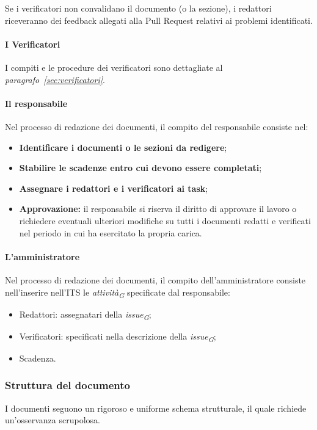 Se i verificatori non convalidano il documento (o la sezione), i redattori riceveranno dei feedback allegati alla Pull Request relativi ai problemi identificati.

\paragraph{I Verificatori}
I compiti e le procedure dei verificatori sono dettagliate al \textit{paragrafo~\ref{sec:verificatori}}.

\paragraph{Il responsabile}
Nel processo di redazione dei documenti, il compito del responsabile consiste nel:
\begin{itemize}
    \item \textbf{Identificare i documenti o le sezioni da redigere};
    \item \textbf{Stabilire le scadenze entro cui devono essere completati};
    \item \textbf{Assegnare i redattori e i verificatori ai task};
    \item \textbf{Approvazione:} il responsabile si riserva il diritto di approvare il lavoro o richiedere eventuali ulteriori modifiche su tutti i documenti redatti e verificati nel periodo in cui ha esercitato la propria carica.
\end{itemize}

\paragraph{L'amministratore}
Nel processo di redazione dei documenti, il compito dell'amministratore consiste nell'inserire nell'ITS le \textit{attività}\textsubscript{\textit{G}} specificate dal responsabile:
    \begin{itemize}
        \item Redattori: assegnatari della \textit{issue}\textsubscript{\textit{G}};
        \item Verificatori: specificati nella descrizione della \textit{issue}\textsubscript{\textit{G}};
        \item Scadenza.
    \end{itemize}

\subsubsection{Struttura del documento}
\label{subsubsec:strutturadocumento}
I documenti seguono un rigoroso e uniforme schema strutturale, il quale richiede un'osservanza scrupolosa.

